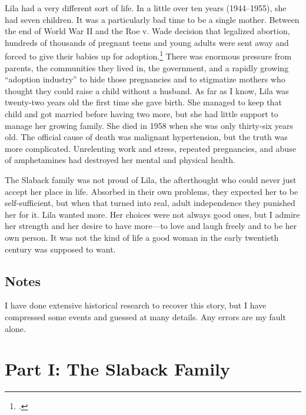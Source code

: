 \documentclass[
  letterpaper,
]{book}
\begin{document}
Lila had a very different sort of life. In a little over ten years
(1944--1955), she had seven children. It was a particularly bad time to
be a single mother. Between the end of World War II and the Roe v. Wade
decision that legalized abortion, hundreds of thousands of pregnant
teens and young adults were sent away and forced to give their babies up
for adoption.\footnote{.} There was enormous
pressure from parents, the communities they lived in, the government,
and a rapidly growing ``adoption industry'' to hide those pregnancies
and to stigmatize mothers who thought they could raise a child without a
husband. As far as I know, Lila was twenty-two years old the first time
she gave birth. She managed to keep that child and got married before
having two more, but she had little support to manage her growing
family. She died in 1958 when she was only thirty-six years old. The
official cause of death was malignant hypertension, but the truth was
more complicated. Unrelenting work and stress, repeated pregnancies, and
abuse of amphetamines had destroyed her mental and physical health.

The Slaback family was not proud of Lila, the afterthought who could
never just accept her place in life. Absorbed in their own problems,
they expected her to be self-sufficient, but when that turned into real,
adult independence they punished her for it. Lila wanted more. Her
choices were not always good ones, but I admire her strength and her
desire to have more---to love and laugh freely and to be her own person.
It was not the kind of life a good woman in the early twentieth century
was supposed to want.

\section{Notes}\label{notes}

I have done extensive historical research to recover this story, but I
have compressed some events and guessed at many details. Any errors are
my fault alone.


\chapter{Part I: The Slaback Family}\label{part-i-the-slaback-family}
\end{document}
